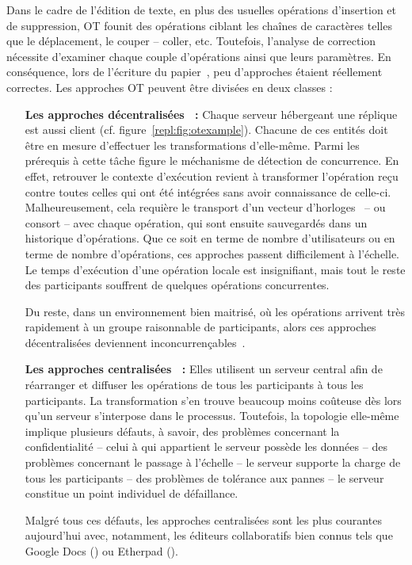 Dans le cadre de l'édition de texte, en plus des usuelles opérations d'insertion
et de suppression, OT founit des opérations ciblant les chaînes de caractères
telles que le déplacement, le couper -- coller, etc. Toutefois, l'analyse de
correction nécessite d'examiner chaque couple d'opérations ainsi que leurs
paramètres. En conséquence, lors de l'écriture du
papier~\cite{imine2003proving}, peu d'approches étaient réellement correctes.
Les approches OT peuvent être divisées en deux classes :
\begin{itemize}
\item [\textbf{Les approches décentralisées~\cite{sun2009contextbased} :}]
  Chaque serveur hébergeant une réplique est aussi client
  (cf. figure~\ref{repl:fig:otexample}). Chacune de ces entités doit être en
  mesure d'effectuer les transformations d'elle-même. Parmi les prérequis à
  cette tâche figure le méchanisme de détection de concurrence. En effet,
  retrouver le contexte d'exécution revient à transformer l'opération reçu
  contre toutes celles qui ont été intégrées sans avoir connaissance de
  celle-ci. Malheureusement, cela requière le transport d'un vecteur
  d'horloges~\cite{lamport1978time} -- ou consort -- avec chaque opération, qui
  sont ensuite sauvegardés dans un historique d'opérations. Que ce soit en terme
  de nombre d'utilisateurs ou en terme de nombre d'opérations, ces approches
  passent difficilement à l'échelle. Le temps d'exécution d'une opération locale
  est insignifiant, mais tout le reste des participants souffrent de quelques
  opérations concurrentes.

  Du reste, dans un environnement bien maitrisé, où les opérations arrivent très
  rapidement à un groupe raisonnable de participants, alors ces approches
  décentralisées deviennent inconcurrençables~\cite{mehdi2014merging}.
\item [\textbf{Les approches centralisées~\cite{nichols1995high} :}] Elles
  utilisent un serveur central afin de réarranger et diffuser les opérations de
  tous les participants à tous les participants. La transformation s'en trouve
  beaucoup moins coûteuse dès lors qu'un serveur s'interpose dans le
  processus. Toutefois, la topologie elle-même implique plusieurs défauts, à
  savoir, des problèmes concernant la confidentialité -- celui à qui appartient
  le serveur possède les données -- des problèmes concernant le passage à
  l'échelle -- le serveur supporte la charge de tous les participants -- des
  problèmes de tolérance aux pannes -- le serveur constitue un point individuel
  de défaillance.

  Malgré tous ces défauts, les approches centralisées sont les plus courantes
  aujourd'hui avec, notamment, les éditeurs collaboratifs bien connus tels que
  Google Docs (\REF) ou Etherpad (\REF).
\end{itemize}

